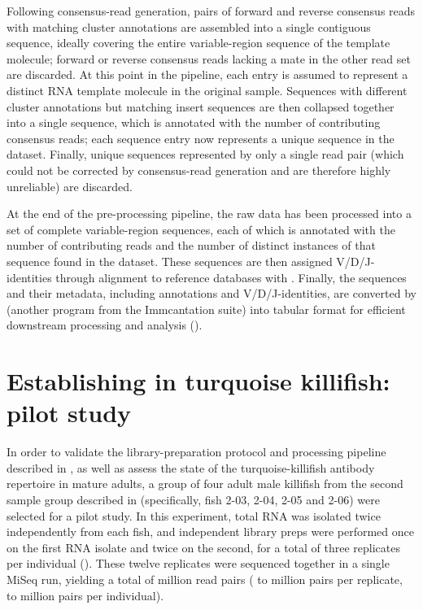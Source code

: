 Following consensus-read generation, pairs of forward and reverse consensus reads with matching cluster annotations are assembled into a single contiguous sequence, ideally covering the entire variable-region sequence of the template molecule; forward or reverse consensus reads lacking a mate in the other read set are discarded. At this point in the pipeline, each entry is assumed to represent a distinct RNA template molecule in the original sample. Sequences with different cluster annotations but matching insert sequences are then collapsed together into a single sequence, which is annotated with the number of contributing consensus reads; each sequence entry now represents a unique sequence in the dataset. Finally, unique sequences represented by only a single read pair (which could not be corrected by consensus-read generation and are therefore highly unreliable) are discarded.

At the end of the  pre-processing pipeline, the raw data has been processed into a set of complete variable-region sequences, each of which is annotated with the number of contributing reads and the number of distinct instances of that sequence found in the dataset. These sequences are then assigned V/D/J-identities through alignment to reference databases with . Finally, the sequences and their metadata, including annotations and V/D/J-identities, are converted by  (another program from the Immcantation suite) into tabular format for efficient downstream processing and analysis ().

\section{Establishing \igseq in turquoise killifish: pilot study}
\label{sec:igseq_pilot}

\newcommand{\embed}[1]{\unskip}

In order to validate the library-preparation protocol and processing pipeline described in , as well as assess the state of the turquoise-killifish antibody repertoire in mature adults, a group of four adult male killifish from the second sample group described in  (specifically, fish 2-03, 2-04, 2-05 and 2-06) were selected for a pilot study. In this experiment, total RNA was isolated twice independently from each fish, and independent library preps were performed once on the first RNA isolate and twice on the second, for a total of three replicates per individual (). These twelve replicates were sequenced together in a single MiSeq run, yielding a total of \embed{_Figures/txt/pilot-reads-raw-total.txt} million read pairs (\embed{_Figures/txt/pilot-reads-raw-replicate-min.txt} to \embed{_Figures/txt/pilot-reads-raw-replicate-max.txt} million pairs per replicate, \embed{_Figures/txt/pilot-reads-raw-individual-min.txt} to \embed{_Figures/txt/pilot-reads-raw-individual-max.txt} million pairs per individual).

